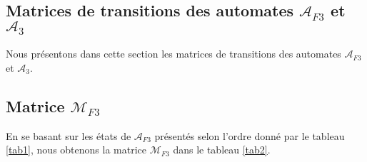 \documentclass[12pt]{memoireuqam1.3}
\begin{document}
 \begin{spacing}{0.30}
\section*{Matrices de transitions des automates $\mathcal{A}_{F3}$ et $\mathcal{A}_{3}$}
 \end{spacing}
Nous présentons dans cette section les matrices de transitions des automates $\mathcal{A}_{F3}$ et  $\mathcal{A}_{3}$.
\begin{spacing}{0.30} 
\subsection*{Matrice $\mathcal{M}_{F3}$}
 \end{spacing}
En se basant sur les états de $\mathcal{A}_{F3}$ présentés selon l'ordre donné par le tableau \ref{tab1}, nous obtenons la matrice $\mathcal{M}_{F3}$ dans le tableau \ref{tab2}.
\small
\end{document}
